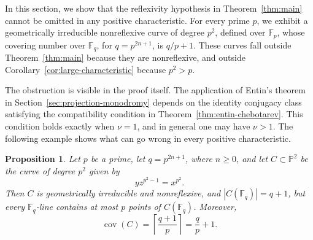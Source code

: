 \documentclass[10pt,a4paper]{amsart}
\newtheorem{proposition}[theorem]{Proposition}
\theoremstyle{definition}
\theoremstyle{remark}
\newcommand{\bF}{\mathbb{F}}
\newcommand{\Fp}{\mathbb{F}_p}
\newcommand{\Fq}{\mathbb{F}_q}
\newcommand{\bP}{\mathbb{P}}
\begin{document}
In this section, we show that the reflexivity hypothesis in
Theorem~\ref{thm:main} cannot be omitted in any positive characteristic. For every prime $p$, we exhibit a geometrically irreducible nonreflexive curve of degree $p^2$, defined over $\Fp$, whose covering number over $\bF_q$, for $q=p^{2n+1}$, is $q/p+1$. These curves fall outside Theorem~\ref{thm:main} because they are nonreflexive, and outside Corollary~\ref{cor:large-characteristic} because $p^2>p$.

The obstruction is visible in the proof itself. The application of Entin's theorem in Section~\ref{sec:projection-monodromy} depends on the identity conjugacy class satisfying the compatibility condition in Theorem~\ref{thm:entin-chebotarev}. This condition holds exactly when $\nu=1$, and in general one may have $\nu>1$. The following example shows what can go wrong in every positive characteristic.

\begin{proposition}\label{prop:nonreflexive-obstruction}
Let $p$ be a prime, let $q=p^{2n+1}$, where $n\geq 0$, and let
$C\subset\bP^2$ be the curve of degree $p^2$ given by
\[
yz^{p^2-1}=x^{p^2}.
\]
Then $C$ is geometrically irreducible and nonreflexive, and
$|C(\Fq)|=q+1$, but every $\Fq$-line contains at most $p$ points of
$C(\Fq)$. Moreover,
\[
\operatorname{cov}(C)
=
\left\lceil\frac{q+1}{p}\right\rceil
=
\frac{q}{p}+1.
\]
\end{proposition}
\end{document}
